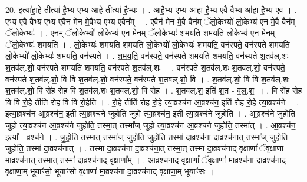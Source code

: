 \documentclass[17pt]{extarticle}
\begin{document}
20. इत्या॑हा॒हे तीत्या॑ है॒भ्य ए॒भ्य आ॒हे तीत्या॑ है॒भ्यः । . आ॒है॒भ्य ए॒भ्य आ॑हा है॒भ्य ए॒वै वैभ्य आ॑हा है॒भ्य ए॒व । . ए॒भ्य ए॒वै वैभ्य ए॒भ्य ए॒वैन॑ मेन मे॒वैभ्य ए॒भ्य ए॒वैन᳚म् । . ए॒वैन॑ मेन मे॒वै वैन॑म् ॅलो॒केभ्यो॑ लो॒केभ्य॑ एन मे॒वै वैन॑म् ॅलो॒केभ्यः॑ । . ए॒न॒म् ॅलो॒केभ्यो॑ लो॒केभ्य॑ एन मेनम् ॅलो॒केभ्यः॑ शमयति शमयति लो॒केभ्य॑ एन मेनम् ॅलो॒केभ्यः॑ शमयति । . लो॒केभ्यः॑ शमयति शमयति लो॒केभ्यो॑ लो॒केभ्यः॑ शमयति॒ वन॑स्पते॒ वन॑स्पते शमयति लो॒केभ्यो॑ लो॒केभ्यः॑ शमयति॒ वन॑स्पते । . श॒म॒य॒ति॒ वन॑स्पते॒ वन॑स्पते शमयति शमयति॒ वन॑स्पते श॒तव॑ल्.शः श॒तव॑ल्.शो॒ वन॑स्पते शमयति शमयति॒ वन॑स्पते श॒तव॑ल्.शः । . वन॑स्पते श॒तव॑ल्.शः श॒तव॑ल्.शो॒ वन॑स्पते॒ वन॑स्पते श॒तव॑ल्.शो॒ वि वि श॒तव॑ल्.शो॒ वन॑स्पते॒ वन॑स्पते श॒तव॑ल्.शो॒ वि । . श॒तव॑ल्.शो॒ वि वि श॒तव॑ल्.शः श॒तव॑ल्.शो॒ वि रो॑ह रोह॒ वि श॒तव॑ल्.शः श॒तव॑ल्.शो॒ वि रो॑ह । . श॒तव॑ल्.श॒ इति॑ श॒त - व॒ल्॒.शः॒ । . वि रो॑ह रोह॒ वि वि रो॒हे तीति॑ रोह॒ वि वि रो॒हेति॑ । . रो॒हे तीति॑ रोह रो॒हे त्या॒व्रश्च॑न आ॒व्रश्च॑न॒ इति॑ रोह रो॒हे त्या॒व्रश्च॑ने । . इत्या॒व्रश्च॑न आ॒व्रश्च॑न॒ इती त्या॒व्रश्च॑ने जुहोति जुहो त्या॒व्रश्च॑न॒ इती त्या॒व्रश्च॑ने जुहोति । . आ॒व्रश्च॑ने जुहोति जुहो त्या॒व्रश्च॑न आ॒व्रश्च॑ने जुहोति॒ तस्मा॒त् तस्मा᳚ज् जुहो त्या॒व्रश्च॑न आ॒व्रश्च॑ने जुहोति॒ तस्मा᳚त् । . आ॒व्रश्च॑न॒ इत्या᳚ - व्रश्च॑ने । . जु॒हो॒ति॒ तस्मा॒त् तस्मा᳚ज् जुहोति जुहोति॒ तस्मा॑ दा॒व्रश्च॑ना दा॒व्रश्च॑ना॒त् तस्मा᳚ज् जुहोति जुहोति॒ तस्मा॑ दा॒व्रश्च॑नात् । . तस्मा॑ दा॒व्रश्च॑ना दा॒व्रश्च॑ना॒त् तस्मा॒त् तस्मा॑ दा॒व्रश्च॑नाद् वृ॒क्षाणां᳚ ॅवृ॒क्षाणा॑ मा॒व्रश्च॑ना॒त् तस्मा॒त् तस्मा॑ दा॒व्रश्च॑नाद् वृ॒क्षाणा᳚म् । . आ॒व्रश्च॑नाद् वृ॒क्षाणां᳚ ॅवृ॒क्षाणा॑ मा॒व्रश्च॑ना दा॒व्रश्च॑नाद् वृ॒क्षाणा॒म् भूयाꣳ॑सो॒ भूयाꣳ॑सो वृ॒क्षाणा॑ मा॒व्रश्च॑ना दा॒व्रश्च॑नाद् वृ॒क्षाणा॒म् भूयाꣳ॑सः । \newline
\end{document}
